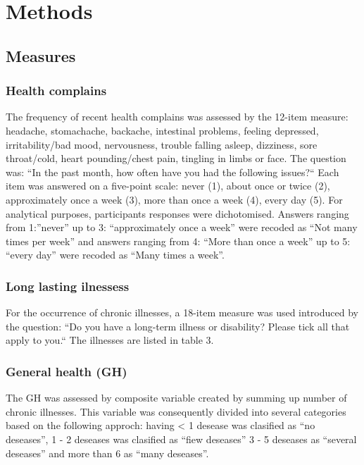 \documentclass[ijerph,article,accept,moreauthors,pdftex]{mdpi}
\begin{document}
\hypertarget{methods}{%
\section{Methods}\label{methods}}

\hypertarget{measures}{%
\subsection{Measures}\label{measures}}

\hypertarget{health-complains}{%
\subsubsection{Health complains}\label{health-complains}}

The frequency of recent health complains was assessed by the 12-item
measure: headache, stomachache, backache, intestinal problems, feeling
depressed, irritability/bad mood, nervousness, trouble falling asleep,
dizziness, sore throat/cold, heart pounding/chest pain, tingling in
limbs or face. The question was: ``In the past month, how often have you
had the following issues?{}`` Each item was answered on a five-point
scale: never (1), about once or twice (2), approximately once a week
(3), more than once a week (4), every day (5). For analytical purposes,
participants responses were dichotomised. Answers ranging from
1:''never'' up to 3: ``approximately once a week'' were recoded as ``Not
many times per week'' and answers ranging from 4: ``More than once a
week'' up to 5: ``every day'' were recoded as ``Many times a week''.

\hypertarget{long-lasting-ilnessess}{%
\subsubsection{Long lasting ilnessess}\label{long-lasting-ilnessess}}

For the occurrence of chronic illnesses, a 18-item measure was used
introduced by the question: ``Do you have a long-term illness or
disability? Please tick all that apply to you.`` The illnesses are
listed in table 3.

\hypertarget{general-health-gh}{%
\subsubsection{General health (GH)}\label{general-health-gh}}

The GH was assessed by composite variable created by summing up number
of chronic illnesses. This variable was consequently divided into
several categories based on the following approch: having \textless{} 1
desease was clasified as ``no deseases'', 1 - 2 deseases was clasified
as ``fiew deseases'' 3 - 5 deseases as ``several deseases'' and more
than 6 as ``many deseases''.
\end{document}

